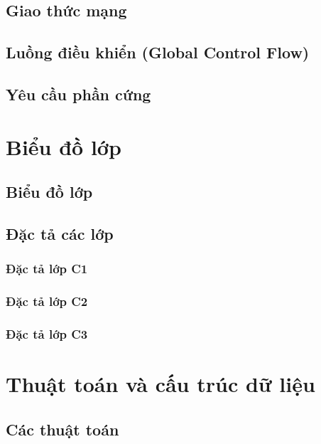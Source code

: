 \documentclass[a4paper, 12pt]{article}
\begin{document}
\subsection{Giao thức mạng}

\subsection{Luồng điều khiển (Global Control Flow)}

\subsection{Yêu cầu phần cứng}

\clearpage

\section{Biểu đồ lớp}

\subsection{Biểu đồ lớp}

\subsection{Đặc tả các lớp}

\subsubsection{Đặc tả lớp C1}

\subsubsection{Đặc tả lớp C2}

\subsubsection{Đặc tả lớp C3}

\clearpage

\section{Thuật toán và cấu trúc dữ liệu}

\subsection{Các thuật toán}
\end{document}
